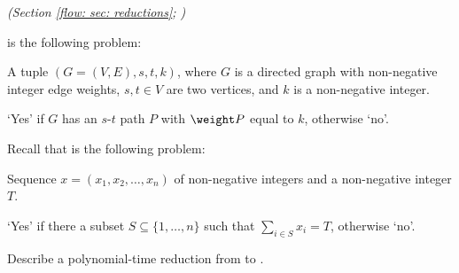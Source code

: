 \documentclass[11pt]{article}
\begin{document}
\newpage


\setlength{\ITEMHT}{1.9in}
{%
{}
}

\newpage




\problem\emph{(Section \ref{flow: sec: reductions}; )} 

 is the following problem:
\begin{mylist}\em
\item[\bf input:] A tuple $(G=(V,E), s, t, k)$,
  where $G$ is a directed graph with non-negative integer edge weights,
  $s,t\in V$ are two vertices, and $k$ is a non-negative integer.
\item[\bf output:]
  `Yes' if $G$ has an $s$-$t$ path $P$ with $\weight P$ equal to $k$, otherwise `no'.
\end{mylist}

Recall that  is the following problem:
\begin{mylist}\em
\item[\bf input:]
  Sequence $x=(x_1, x_2, \ldots, x_n)$ of non-negative integers and a non-negative integer $T$.
\item[\bf output:]
  `Yes' if there a subset $S\subseteq \{1,\ldots,n\}$ such that $\sum_{i\in S} x_i = T$, otherwise `no'.
\end{mylist}

Describe a polynomial-time reduction from  to .
\end{document}
